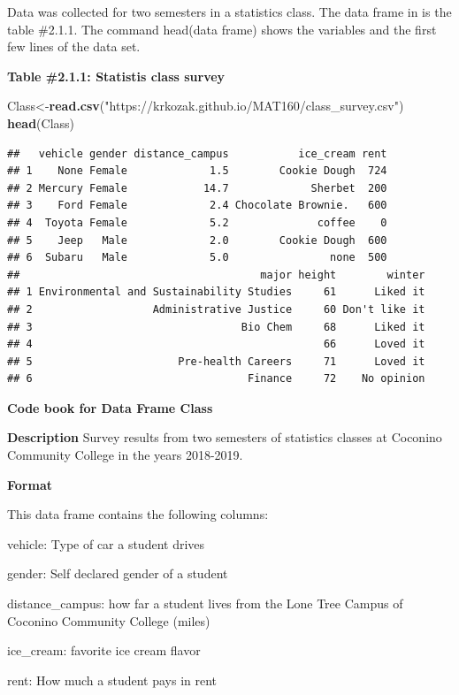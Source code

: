 \documentclass[]{book}
\newenvironment{Shaded}{\begin{snugshade}}{\end{snugshade}}
\newcommand{\KeywordTok}[1]{\textcolor[rgb]{0.13,0.29,0.53}{\textbf{#1}}}
\newcommand{\NormalTok}[1]{#1}
\newcommand{\StringTok}[1]{\textcolor[rgb]{0.31,0.60,0.02}{#1}}
\begin{document}
Data was collected for two semesters in a statistics class. The data frame in is the table \#2.1.1. The command head(data frame) shows the variables and the first few lines of the data set.

\textbf{Table \#2.1.1: Statistis class survey}

\begin{Shaded}
\begin{Highlighting}[]
\NormalTok{Class<-}\KeywordTok{read.csv}\NormalTok{(}\StringTok{"https://krkozak.github.io/MAT160/class_survey.csv"}\NormalTok{)}
\KeywordTok{head}\NormalTok{(Class)}
\end{Highlighting}
\end{Shaded}

\begin{verbatim}
##   vehicle gender distance_campus           ice_cream rent
## 1    None Female             1.5        Cookie Dough  724
## 2 Mercury Female            14.7             Sherbet  200
## 3    Ford Female             2.4 Chocolate Brownie.   600
## 4  Toyota Female             5.2              coffee    0
## 5    Jeep   Male             2.0        Cookie Dough  600
## 6  Subaru   Male             5.0                none  500
##                                      major height        winter
## 1 Environmental and Sustainability Studies     61      Liked it
## 2                   Administrative Justice     60 Don't like it
## 3                                 Bio Chem     68      Liked it
## 4                                              66      Loved it
## 5                       Pre-health Careers     71      Loved it
## 6                                  Finance     72    No opinion
\end{verbatim}

\textbf{Code book for Data Frame Class}

\textbf{Description}
Survey results from two semesters of statistics classes at Coconino Community College in the years 2018-2019.

\textbf{Format}

This data frame contains the following columns:

vehicle: Type of car a student drives

gender: Self declared gender of a student

distance\_campus: how far a student lives from the Lone Tree Campus of Coconino Community College (miles)

ice\_cream: favorite ice cream flavor

rent: How much a student pays in rent
\end{document}
